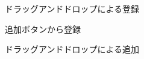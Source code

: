 \begin{figure}[h]
    \begin{center}
    \end{center}
    \caption{ドラッグアンドドロップによる登録}
    \label{fig:add1}
\end{figure}

\begin{figure}[h]
    \begin{center}
    \end{center}
    \caption{追加ボタンから登録}
    \label{fig:add2}
\end{figure}


\begin{figure}[h]
    \begin{center}
    \end{center}
    \caption{ドラッグアンドドロップによる追加}
    \label{fig:add1}
\end{figure}

